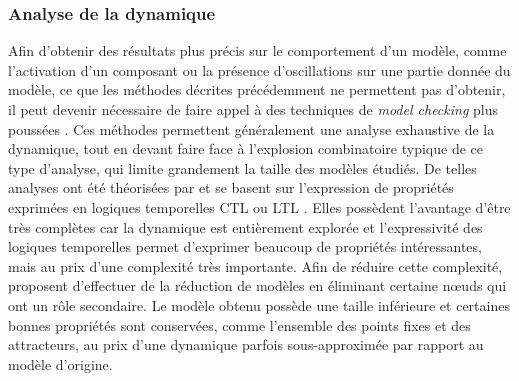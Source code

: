 
% 
% 

\subsubsection*{Analyse de la dynamique}
Afin d'obtenir des résultats plus précis sur le comportement d'un modèle,
comme l'activation d'un composant ou la présence d'oscillations sur une partie
donnée du modèle,
ce que les méthodes décrites précédemment ne permettent pas d'obtenir,
il peut devenir nécessaire de faire appel à des techniques
de \textit{model checking} plus poussées
.
Ces méthodes permettent généralement une analyse exhaustive de la dynamique,
tout en devant faire face à l'explosion combinatoire typique de ce type d'analyse,
qui limite grandement la taille des modèles étudiés.
De telles analyses ont été théorisées par 
et se basent sur l'expression de propriétés exprimées en logiques temporelles
CTL \cite{Clarke82} ou LTL \cite{Pnueli77}.
Elles possèdent l'avantage d'être très complètes
car la dynamique est entièrement explorée et l'expressivité des logiques temporelles permet
d'exprimer beaucoup de propriétés intéressantes,
mais au prix d'une complexité très importante.
Afin de réduire cette complexité,
 proposent d'effectuer de la réduction de modèles
en éliminant certaine nœuds qui ont un rôle secondaire.
Le modèle obtenu possède une taille inférieure et certaines bonnes propriétés sont conservées,
comme l'ensemble des points fixes et des attracteurs,
au prix d'une dynamique parfois sous-approximée par rapport au modèle d'origine.
